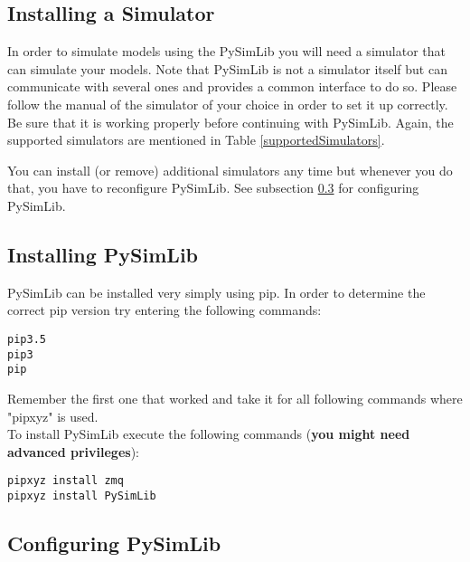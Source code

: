 \subsection{Installing a Simulator}

In order to simulate models using the PySimLib you will need a simulator that can simulate your models.
Note that PySimLib is not a simulator itself but can communicate with several ones and provides a common interface to do so.
Please follow the manual of the simulator of your choice in order to set it up correctly.
Be sure that it is working properly before continuing with PySimLib.
Again, the supported simulators are mentioned in Table \ref{supportedSimulators}.

You can install (or remove) additional simulators any time but whenever you do that, you have to reconfigure PySimLib.
See subsection \ref{configuringPySimLib} for configuring PySimLib.





\subsection{Installing PySimLib}

PySimLib can be installed very simply using pip.
In order to determine the correct pip version try entering the following commands:
\lstset{language=bash}
\begin{lstlisting}
pip3.5
pip3
pip
\end{lstlisting}

Remember the first one that worked and take it for all following commands where "pipxyz" is used.
\\
To install PySimLib execute the following commands (\textbf{you might need advanced privileges}):
\begin{lstlisting}
pipxyz install zmq
pipxyz install PySimLib
\end{lstlisting}






\subsection{Configuring PySimLib}
\label{configuringPySimLib}

